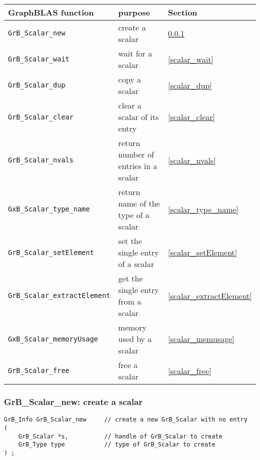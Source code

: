 \documentclass[12pt]{article}
\begin{document}
{\vspace{0.2in}
{\footnotesize
\begin{tabular}{lll}
\hline
GraphBLAS function   & purpose                                      & Section \\
\hline
\verb'GrB_Scalar_new'            & create a scalar                      & \ref{scalar_new} \\
\verb'GrB_Scalar_wait'           & wait for a scalar                    & \ref{scalar_wait} \\
\verb'GrB_Scalar_dup'            & copy a scalar                        & \ref{scalar_dup} \\
\verb'GrB_Scalar_clear'          & clear a scalar of its entry          & \ref{scalar_clear} \\
\verb'GrB_Scalar_nvals'          & return number of entries in a scalar & \ref{scalar_nvals}  \\
\verb'GxB_Scalar_type_name'      & return name of the type of a scalar  & \ref{scalar_type_name} \\
\verb'GrB_Scalar_setElement'     & set the single entry of a scalar     & \ref{scalar_setElement} \\
\verb'GrB_Scalar_extractElement' & get the single entry from a scalar   & \ref{scalar_extractElement} \\
\verb'GxB_Scalar_memoryUsage'    & memory used by a scalar              & \ref{scalar_memusage} \\
\verb'GrB_Scalar_free'           & free a scalar                        & \ref{scalar_free} \\
\hline
\end{tabular}
}

\subsubsection{{\sf GrB\_Scalar\_new:} create a scalar}
\label{scalar_new}

\begin{mdframed}[userdefinedwidth=6in]
{\footnotesize
\begin{verbatim}
GrB_Info GrB_Scalar_new     // create a new GrB_Scalar with no entry
(
    GrB_Scalar *s,          // handle of GrB_Scalar to create
    GrB_Type type           // type of GrB_Scalar to create
) ;
\end{verbatim}
} \end{mdframed}

}
\end{document}
